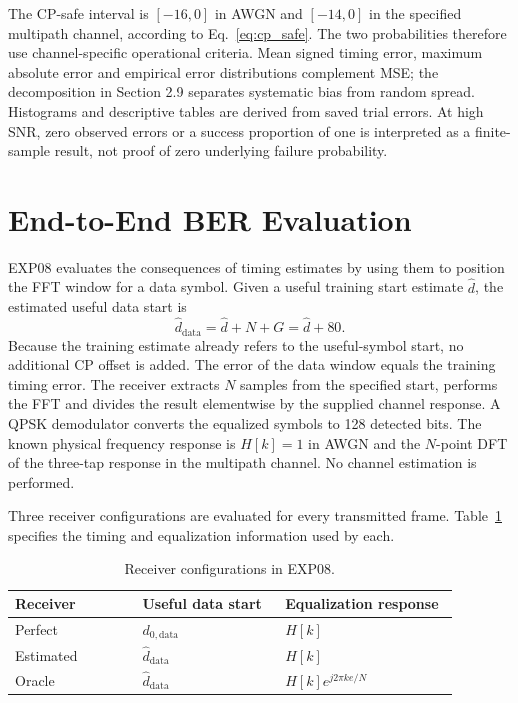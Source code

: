 The CP-safe interval is $[-16,0]$ in AWGN and $[-14,0]$ in the specified multipath channel, according to Eq.~\eqref{eq:cp_safe}. The two probabilities therefore use channel-specific operational criteria. Mean signed timing error, maximum absolute error and empirical error distributions complement MSE; the decomposition in Section 2.9 separates systematic bias from random spread. Histograms and descriptive tables are derived from saved trial errors. At high SNR, zero observed errors or a success proportion of one is interpreted as a finite-sample result, not proof of zero underlying failure probability.

\section{End-to-End BER Evaluation}
\label{sec:method_receiver}
EXP08 evaluates the consequences of timing estimates by using them to position the FFT window for a data symbol. Given a useful training start estimate $\hat d$, the estimated useful data start is
\begin{equation}
 \hat d_{\mathrm{data}}=\hat d+N+G=\hat d+80.
\end{equation}
Because the training estimate already refers to the useful-symbol start, no additional CP offset is added. The error of the data window equals the training timing error. The receiver extracts $N$ samples from the specified start, performs the FFT and divides the result elementwise by the supplied channel response. A QPSK demodulator converts the equalized symbols to 128 detected bits. The known physical frequency response is $H[k]=1$ in AWGN and the $N$-point DFT of the three-tap response in the multipath channel. No channel estimation is performed.

Three receiver configurations are evaluated for every transmitted frame. Table~\ref{tab:method_receivers} specifies the timing and equalization information used by each.

\begin{table}[htbp]
\centering
\caption{Receiver configurations in EXP08.}
\label{tab:method_receivers}
\small
\begin{tabular}{p{0.25\linewidth}p{0.29\linewidth}p{0.34\linewidth}}
\hline
Receiver & Useful data start & Equalization response\\ \hline
Perfect & $d_{0,\mathrm{data}}$ & $H[k]$\\
Estimated & $\hat d_{\mathrm{data}}$ & $H[k]$\\
Oracle & $\hat d_{\mathrm{data}}$ & $H[k]e^{j2\pi ke/N}$\\ \hline
\end{tabular}
\end{table}


